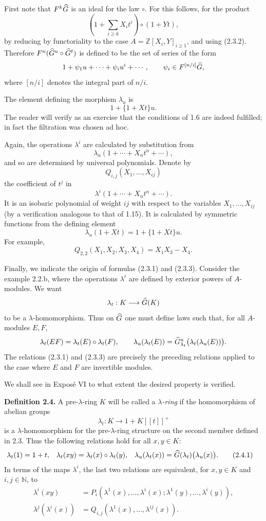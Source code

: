 \documentclass[11pt]{article}
\begin{document}
First note that \(F^k\widehat G\) is an ideal for the law \(\circ\). For this follows, for the product
\[
  \left(1+\sum_{i\geq k}X_i t^i\right)\circ(1+Yt),
\]
by reducing by functoriality to the case \(A=\mathbb Z[X_i,Y]_{i\geq 1}\), and using (2.3.2). Therefore \(F^n(\widehat G^u\circ\widehat G^t)\) is defined to be the set of series of the form
\[
  1+\psi_1u+\cdots+\psi_iu^i+\cdots,\qquad
  \psi_i\in F^{[n/i]}\widehat G,
\]
where \([n/i]\) denotes the integral part of \(n/i\).

The element defining the morphism \(\lambda_u\) is
\[
  1+\{1+Xt\}u.
\]
The reader will verify as an exercise that the conditions of 1.6 are indeed fulfilled; in fact the filtration was chosen ad hoc.

Again, the operations \(\lambda^i\) are calculated by substitution from
\[
  \lambda_u(1+\cdots+X_nt^n+\cdots),
\]
and so are determined by universal polynomials. Denote by
\[
  Q_{i,j}(X_1,\ldots,X_{ij})
\]
the coefficient of \(t^j\) in
\[
  \lambda^i(1+\cdots+X_nt^n+\cdots).
\]
It is an isobaric polynomial of weight \(ij\) with respect to the variables \(X_1,\ldots,X_{ij}\) (by a verification analogous to that of 1.15). It is calculated by symmetric functions from the defining element
\begin{equation}\tag{2.3.3}
  \lambda_u(1+Xt)=1+\{1+Xt\}u .
\end{equation}
For example,
\[
  Q_{2,2}(X_1,X_2,X_3,X_4)=X_1X_3-X_4.
\]

Finally, we indicate the origin of formulas (2.3.1) and (2.3.3). Consider the example 2.2.b, where the operations \(\lambda^i\) are defined by exterior powers of \(A\)-modules. We want
\[
  \lambda_t:K\longrightarrow \widehat G(K)
\]
to be a \(\lambda\)-homomorphism. Thus on \(\widehat G\) one must define laws such that, for all \(A\)-modules \(E,F\),
\[
  \lambda_t(EF)=\lambda_t(E)\circ\lambda_t(F),\qquad
  \lambda_u(\lambda_t(E))=\widehat G^u_{\lambda_t}\bigl(\lambda_t(\lambda_u(E))\bigr).
\]
The relations (2.3.1) and (2.3.3) are precisely the preceding relations applied to the case where \(E\) and \(F\) are invertible modules.

We shall see in Exposé VI to what extent the desired property is verified.

\textbf{Definition 2.4.} A pre-\(\lambda\)-ring \(K\) will be called a \emph{\(\lambda\)-ring} if the homomorphism of abelian groups
\[
  \lambda_t:K\longrightarrow 1+K[[t]]^+
\]
is a \(\lambda\)-homomorphism for the pre-\(\lambda\)-ring structure on the second member defined in 2.3. Thus the following relations hold for all \(x,y\in K\):
\begin{align}
  \lambda_t(1)&=1+t,&
  \lambda_t(xy)&=\lambda_t(x)\circ\lambda_t(y),&
  \lambda_u(\lambda_t(x))&=\widehat G(\lambda_t)\bigl(\lambda_u(x)\bigr).
  \tag{2.4.1}
\end{align}
In terms of the maps \(\lambda^i\), the last two relations are equivalent, for \(x,y\in K\) and \(i,j\in\mathbb N\), to
\begin{align}
  \lambda^i(xy)
  &=P_i(\lambda^1(x),\ldots,\lambda^i(x);
       \lambda^1(y),\ldots,\lambda^i(y)), \tag{2.4.2}\\
  \lambda^j(\lambda^i(x))
  &=Q_{i,j}(\lambda^1(x),\ldots,\lambda^{ij}(x)). \tag{2.4.3}
\end{align}
\end{document}
